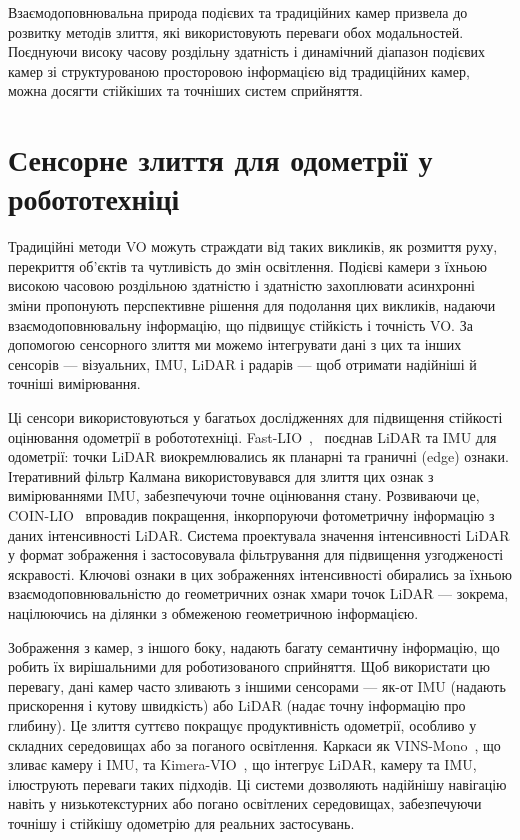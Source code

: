 Взаємодоповнювальна природа подієвих та традиційних камер призвела до розвитку методів злиття, які використовують переваги обох модальностей. Поєднуючи високу часову роздільну здатність і динамічний діапазон подієвих камер зі структурованою просторовою інформацією від традиційних камер, можна досягти стійкіших та точніших систем сприйняття.

\section{Сенсорне злиття для одометрії у робототехніці}\label{sec:SFodoR}

Традиційні методи VO можуть страждати від таких викликів, як розмиття руху, перекриття об'єктів та чутливість до змін освітлення. Подієві камери з їхньою високою часовою роздільною здатністю і здатністю захоплювати асинхронні зміни пропонують перспективне рішення для подолання цих викликів, надаючи взаємодоповнювальну інформацію, що підвищує стійкість і точність VO. За допомогою сенсорного злиття ми можемо інтегрувати дані з цих та інших сенсорів — візуальних, IMU, LiDAR і радарів — щоб отримати надійніші й точніші вимірювання.

Ці сенсори використовуються у багатьох дослідженнях для підвищення стійкості оцінювання одометрії в робототехніці. Fast-LIO~\cite{xu2021fast},~\cite{bai2022faster} поєднав LiDAR та IMU для одометрії: точки LiDAR виокремлювались як планарні та граничні (edge) ознаки. Ітеративний фільтр Калмана використовувався для злиття цих ознак з вимірюваннями IMU, забезпечуючи точне оцінювання стану. Розвиваючи це, COIN-LIO~\cite{pfreundschuh2024coin} впровадив покращення, інкорпоруючи фотометричну інформацію з даних інтенсивності LiDAR. Система проектувала значення інтенсивності LiDAR у формат зображення і застосовувала фільтрування для підвищення узгодженості яскравості. Ключові ознаки в цих зображеннях інтенсивності обирались за їхньою взаємодоповнювальністю до геометричних ознак хмари точок LiDAR — зокрема, націлюючись на ділянки з обмеженою геометричною інформацією.


Зображення з камер, з іншого боку, надають багату семантичну інформацію, що робить їх вирішальними для роботизованого сприйняття. Щоб використати цю перевагу, дані камер часто зливають з іншими сенсорами — як-от IMU (надають прискорення і кутову швидкість) або LiDAR (надає точну інформацію про глибину). Це злиття суттєво покращує продуктивність одометрії, особливо у складних середовищах або за поганого освітлення. Каркаси як VINS-Mono~\cite{qin2018vins}, що зливає камеру і IMU, та Kimera-VIO~\cite{rosinol2020kimera, rosinol2021kimera}, що інтегрує LiDAR, камеру та IMU, ілюструють переваги таких підходів. Ці системи дозволяють надійнішу навігацію навіть у низькотекстурних або погано освітлених середовищах, забезпечуючи точнішу і стійкішу одометрію для реальних застосувань.
